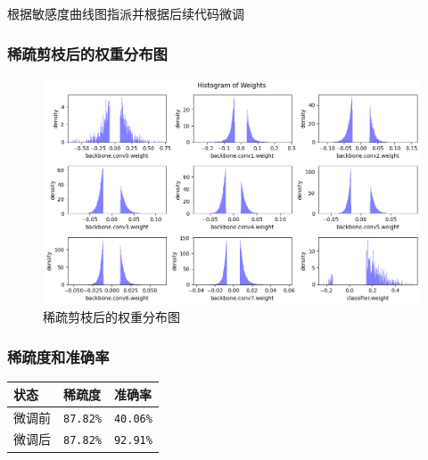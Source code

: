 \documentclass{article}
\begin{document}
根据敏感度曲线图指派并根据后续代码微调

\subsubsection{稀疏剪枝后的权重分布图}

\begin{figure}[H]
    \centering
    \includegraphics[width=1\textwidth]{output5.png}
    \caption{稀疏剪枝后的权重分布图}
\end{figure}

\subsubsection{稀疏度和准确率}

\begin{tabularx}{\textwidth}{l X X}
\toprule
\textbf{状态} & \textbf{稀疏度} & \textbf{准确率} \\
\midrule
微调前 & \texttt{87.82\%} & \texttt{40.06\%} \\
微调后 & \texttt{87.82\%} & \texttt{92.91\%} \\
\bottomrule
\end{tabularx}
\end{document}
